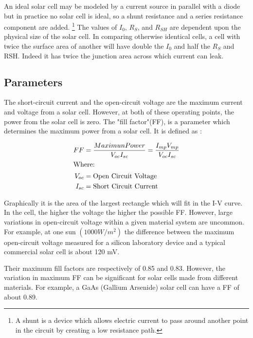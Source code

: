 \documentclass[11pt]{article} %
\begin{document}
An ideal solar cell may be modeled by a current source in parallel with a diode but in practice no solar cell is ideal, so a shunt resistance and a series resistance component are added. \footnote{A shunt is a device which allows  electric current  to pass around another point in the  circuit  by creating a low resistance path.} The values of $I_{0}$, $R_{S}$, and $R_{SH}$ are dependent upon the physical size of the solar cell. In comparing otherwise identical cells, a cell with twice the surface area of another will have double the $I_{0}$ and half the $R_{S}$ and RSH. Indeed it has twice the junction area across which current can leak.


\subsection{Parameters}

The short-circuit current and the open-circuit voltage are the maximum current and voltage from a solar cell. However, at both of these operating points, the power from the solar cell is zero. The "fill factor"(FF), is a parameter which determines the maximum power from a solar cell. It is defined as : 

\begin{align}
FF &= \frac{MaximunPower}{V_{oc}I_{sc}}  = \frac{I_{mp}V_{mp}}{V_{oc}I_{sc}} \\
\intertext{Where:}
V_{oc} &= \text{Open Circuit Voltage} \\
I_{sc} &= \text{Short Circuit Current} 
\end{align}

%


Graphically it is the area of the largest rectangle which will fit in the I-V curve. In the cell, the higher the voltage the higher the possible FF. However, large variations in open-circuit voltage within a given material system are uncommon. For example, at one sun $(1000 W/m^2)$ the difference between the maximum open-circuit voltage measured for a silicon laboratory device and a typical commercial solar cell is about 120 mV. 

Their maximum fill factors are respectively of 0.85 and 0.83. However, the variation in maximum FF can be significant for solar cells made from different materials. For example, a GaAs (Gallium Arsenide) solar cell can have a FF of about 0.89. 
\end{document}
